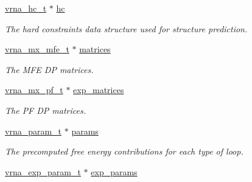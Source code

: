 \begin{Indent}
\begin{DoxyCompactItemize}
\mbox{\hyperlink{group__hard__constraints_gac7e4c4f8abe3163a68110c5bff24e01d}{vrna\+\_\+hc\+\_\+t}} $\ast$ \mbox{\hyperlink{group__fold__compound_aceaa904dbf50092d403ca99422e8f824}{hc}}
\begin{DoxyCompactList}\small\item\em The hard constraints data structure used for structure prediction. \end{DoxyCompactList}\item 
\mbox{\label{group__fold__compound_aca8be7bdc65bafe2172c6ee777f18568}} 
\mbox{\hyperlink{group__dp__matrices_gae5aef35d016475e758f619b7bcb534f9}{vrna\+\_\+mx\+\_\+mfe\+\_\+t}} $\ast$ \mbox{\hyperlink{group__fold__compound_aca8be7bdc65bafe2172c6ee777f18568}{matrices}}
\begin{DoxyCompactList}\small\item\em The M\+FE DP matrices. \end{DoxyCompactList}\item 
\mbox{\label{group__fold__compound_afc38ed5a1028a2712d2365274bf49727}} 
\mbox{\hyperlink{group__dp__matrices_ga68729ab3fed26bdd1806fa814f172fc1}{vrna\+\_\+mx\+\_\+pf\+\_\+t}} $\ast$ \mbox{\hyperlink{group__fold__compound_afc38ed5a1028a2712d2365274bf49727}{exp\+\_\+matrices}}
\begin{DoxyCompactList}\small\item\em The PF DP matrices. \end{DoxyCompactList}\item 
\mbox{\label{group__fold__compound_a19b8720c2c5321c1b97c830bd17566ea}} 
\mbox{\hyperlink{group__energy__parameters_ga8a69ca7d787e4fd6079914f5343a1f35}{vrna\+\_\+param\+\_\+t}} $\ast$ \mbox{\hyperlink{group__fold__compound_a19b8720c2c5321c1b97c830bd17566ea}{params}}
\begin{DoxyCompactList}\small\item\em The precomputed free energy contributions for each type of loop. \end{DoxyCompactList}\item 
\mbox{\label{group__fold__compound_a7052a5d24f6091b9c5f79edcc9456a12}} 
\mbox{\hyperlink{group__energy__parameters_ga01d8b92fe734df8d79a6169482c7d8d8}{vrna\+\_\+exp\+\_\+param\+\_\+t}} $\ast$ \mbox{\hyperlink{group__fold__compound_a7052a5d24f6091b9c5f79edcc9456a12}{exp\+\_\+params}}

\end{DoxyCompactItemize}
\end{Indent}
